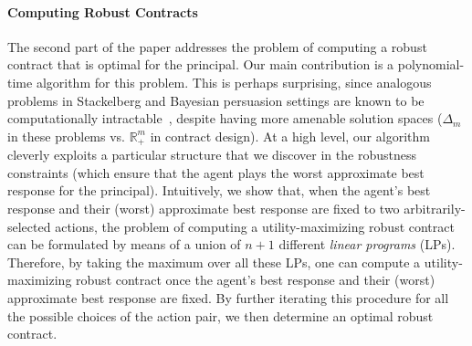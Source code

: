 \paragraph{Computing Robust Contracts}
%
The second part of the paper addresses the problem of computing a robust contract that is optimal for the principal.
%
Our main contribution is a polynomial-time algorithm for this problem.
%
%
This is perhaps surprising, since analogous problems in Stackelberg and Bayesian persuasion settings are known to be computationally intractable~\citep{gan2024robust,yang2024computational},
despite having more amenable solution spaces ($\Delta_m$ in these problems vs. $\mathbb{R}_+^m$ in contract design).
%
%
At a high level, our algorithm cleverly exploits a particular structure that we discover in the robustness constraints (which ensure that the agent plays the worst approximate best response for the principal).
%
%
%
Intuitively, we show that, when the agent's best response and their (worst) approximate best response are fixed to two arbitrarily-selected actions, the problem of computing a utility-maximizing robust contract can be formulated by means of a union of $n+1$ different \emph{linear programs} (LPs).
% 
Therefore, by taking the maximum over all these LPs, one can compute a utility-maximizing robust contract once the agent’s best response and their (worst) approximate best response are fixed.
% 
By further iterating this procedure for all the possible choices of the action pair, we then determine an optimal robust contract.



